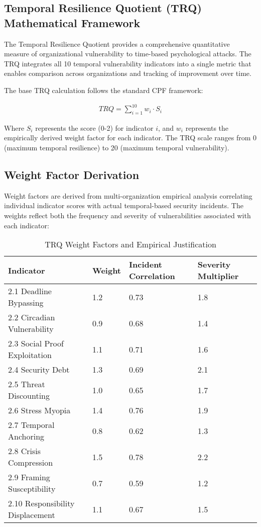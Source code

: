 \documentclass[11pt,a4paper]{article}
\begin{document}
\subsection{Temporal Resilience Quotient (TRQ) Mathematical Framework}

The Temporal Resilience Quotient provides a comprehensive quantitative measure of organizational vulnerability to time-based psychological attacks. The TRQ integrates all 10 temporal vulnerability indicators into a single metric that enables comparison across organizations and tracking of improvement over time.

The base TRQ calculation follows the standard CPF framework:

\begin{align}
TRQ = \sum_{i=1}^{10} w_i \cdot S_i
\end{align}

Where $S_i$ represents the score (0-2) for indicator $i$, and $w_i$ represents the empirically derived weight factor for each indicator. The TRQ scale ranges from 0 (maximum temporal resilience) to 20 (maximum temporal vulnerability).

\subsection{Weight Factor Derivation}

Weight factors are derived from multi-organization empirical analysis correlating individual indicator scores with actual temporal-based security incidents. The weights reflect both the frequency and severity of vulnerabilities associated with each indicator:

\begin{table}[H]
\centering
\caption{TRQ Weight Factors and Empirical Justification}
\begin{tabular}{llll}
\toprule
Indicator & Weight & Incident Correlation & Severity Multiplier \\
\midrule
2.1 Deadline Bypassing & 1.2 & 0.73 & 1.8 \\
2.2 Circadian Vulnerability & 0.9 & 0.68 & 1.4 \\
2.3 Social Proof Exploitation & 1.1 & 0.71 & 1.6 \\
2.4 Security Debt & 1.3 & 0.69 & 2.1 \\
2.5 Threat Discounting & 1.0 & 0.65 & 1.7 \\
2.6 Stress Myopia & 1.4 & 0.76 & 1.9 \\
2.7 Temporal Anchoring & 0.8 & 0.62 & 1.3 \\
2.8 Crisis Compression & 1.5 & 0.78 & 2.2 \\
2.9 Framing Susceptibility & 0.7 & 0.59 & 1.2 \\
2.10 Responsibility Displacement & 1.1 & 0.67 & 1.5 \\
\bottomrule
\end{tabular}
\end{table}
\end{document}
